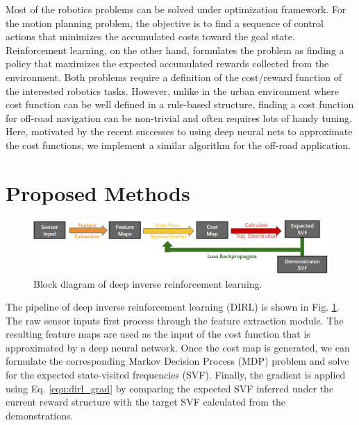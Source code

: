 \documentclass[../thesis.tex]{subfiles}
\begin{document}
 
 
 
Most of the robotics problems can be solved under optimization framework.
For the motion planning problem, the objective is to find a sequence of control actions that minimizes the accumulated costs toward the goal state.
Reinforcement learning, on the other hand, formulates the problem as finding a policy that maximizes the expected accumulated rewards collected from the environment.
Both problems require a definition of the cost/reward function of the interested robotics tasks.
However, unlike in the urban environment where cost function can be well defined in a rule-based structure, finding a cost function for off-road navigation can be non-trivial and often requires lots of handy tuning. \cite{silver2010learning}
Here, motivated by the recent successes \cite{wulfmeier2015maximum,wulfmeier2016watch} to using deep neural nets to approximate the cost functions, we implement a similar algorithm for the off-road application.
 
 
\section{Proposed Methods}
 
\begin{figure}[t]
        \begin{center}
         \centerline{\includegraphics[width=\columnwidth]{./DIRL/fig/dirl_diagram.png}}
               \caption{Block diagram of deep inverse reinforcement learning.}
               \label{fig:dirl_diagram}
        \end{center}
        \vskip -0.2in
\end{figure}
 
The pipeline of deep inverse reinforcement learning (DIRL) is shown in Fig. \ref{fig:dirl_diagram}.
The raw sensor inputs first process through the feature extraction module.
The resulting feature maps are used as the input of the cost function that is approximated by a deep neural network.
Once the cost map is generated, we can formulate the corresponding Markov Decision Process (MDP) problem and solve for the expected state-visited frequencies (SVF).
Finally, the gradient is applied using Eq. \ref{equ:dirl_grad} by comparing the expected SVF inferred under the current reward structure with the target SVF calculated from the demonstrations.
 
\end{document}
